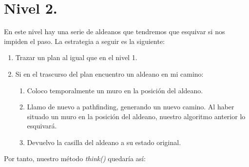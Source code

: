 \documentclass[12pt,spanish]{article}
\begin{document}
\newpage

\section{Nivel 2.}

En este nivel hay una serie de aldeanos que tendremos que esquivar si nos impiden el paso. La estrategia a seguir es la siguiente:

\begin{enumerate}
  \item Trazar un plan al igual que en el nivel 1.
  \item Si en el trascurso del plan encuentro un aldeano en mi camino:
    \begin{enumerate}
      \item Coloco temporalmente un muro en la posición del aldeano.
      \item Llamo de nuevo a pathfinding, generando un nuevo camino. Al haber situado un muro en la posición del aldeano, nuestro algoritmo anterior lo esquivará.
      \item Devuelvo la casilla del aldeano a su estado original.
    \end{enumerate}
\end{enumerate}

Por tanto, nuestro método \emph{think()} quedaría así:
\end{document}
